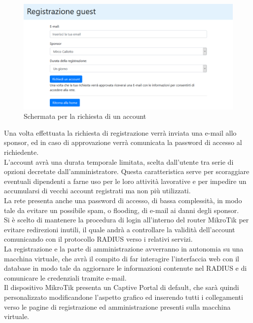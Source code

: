 \documentclass[Realizzazione.tex]{subfiles}
\begin{document}
\begin{figure}[H]
	\centering
	\includegraphics[width=1.1\linewidth]{"images/CaptivePortalReq"}
	\caption{Schermata per la richiesta di un account}
	\label{fig:Schermata per la richiesta di un account}
\end{figure}

Una volta effettuata la richiesta di registrazione verrà inviata una e-mail allo sponsor, ed in caso di approvazione verrà comunicata la password di accesso al richiedente. \\
L'account avrà una durata temporale limitata, scelta dall'utente tra serie di opzioni decretate dall'amministratore. Questa caratteristica serve per scoraggiare eventuali dipendenti a farne uso per le loro attività lavorative e per impedire un accumularsi di vecchi account registrati ma non più utilizzati. \\
\newpage
La rete presenta anche una password di accesso, di bassa complessità, in modo tale da evitare un possibile spam, o flooding, di e-mail ai danni degli sponsor. \\

Si è scelto di mantenere la procedura di login all'interno del router MikroTik per evitare redirezioni inutili, il quale andrà a controllare la validità dell'account comunicando con il protocollo RADIUS verso i relativi servizi. \\
La registrazione e la parte di amministrazione avverranno in autonomia su una macchina virtuale, che avrà il compito di far interagire l'interfaccia web con il database in modo tale da aggiornare le informazioni contenute nel RADIUS e di comunicare le credenziali tramite e-mail. \\

Il dispositivo MikroTik presenta un Captive Portal di default, che sarà quindi personalizzato modificandone l'aspetto grafico ed inserendo tutti i collegamenti verso le pagine di registrazione ed amministrazione presenti sulla macchina virtuale. \\
\end{document}
